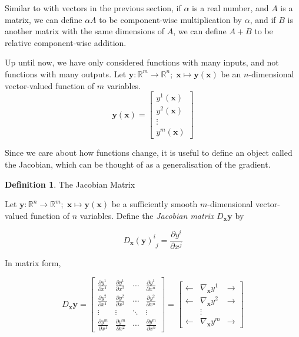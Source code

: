 \documentclass[a4paper]{article}
\theoremstyle{plain} %
\theoremstyle{definition} %
\newtheorem{definition}[theorem]{Definition}
\numberwithin{equation}{subsection}
\newcommand{\R}{\mathbb{R}}
\newcommand{\del}[2]{\frac{\partial #1}{\partial #2}}
\newcommand{\vx}{{\textbf{x}}}
\newcommand{\vy}{{\textbf{y}}}
\begin{document}
Similar to with vectors in the previous section, if $\alpha$ is a real number, and $A$ is a matrix, we can define 
$\alpha A$ to be component-wise multiplication by $\alpha$, and if $B$ is another matrix with the same dimensions of $A$, we can define 
$A + B$ to be relative component-wise addition.

Up until now, we have only considered functions with many inputs, and not functions with many outputs. 
Let $\vy : \R^m \rightarrow \R^n; \; \vx \mapsto \vy(\vx)$ be an $n$-dimensional vector-valued function of $m$ variables.
\[ 
\vy(\vx) = \begin{bmatrix}
  y^1(\vx) \\
  y^2(\vx) \\
  \vdots \\
  y^m(\vx)
\end{bmatrix}
\]

Since we care about how functions change, it is useful to define an object called the Jacobian, which can be thought of as a generalisation of the gradient.

\begin{definition} \label{def:jacobian}
  The Jacobian Matrix
  
  Let $\vy : \R^n \rightarrow \R^m; \; \vx \mapsto \vy(\vx)$ be a sufficiently smooth $m$-dimensional vector-valued function of $n$ variables.
  Define the \emph{Jacobian matrix} $D_{\vx}\vy$ by

  \[
  {D_\vx (\vy)^i }_j  = \del{y^i}{x^j}
  \]

  In matrix form,

  \[
  D_{\vx}\vy = \begin{bmatrix}
  \del{y^1}{x^1} & \del{y^1}{x^2} & \cdots & \del{y^1}{x^n} \\
  \del{y^2}{x^1} & \del{y^2}{x^2} & \cdots & \del{y^2}{x^n} \\
  \vdots & \vdots & \ddots & \vdots \\
  \del{y^m}{x^1} & \del{y^m}{x^2} & \cdots & \del{y^m}{x^n}
  \end{bmatrix} = \begin{bmatrix}
  \leftarrow & \nabla_\vx y^1 & \rightarrow \\
  \leftarrow & \nabla_\vx y^2& \rightarrow  \\
   & \vdots &  \\
  \leftarrow & \nabla_\vx y^m & \rightarrow 
  \end{bmatrix}
  \]
\end{definition}
\end{document}
